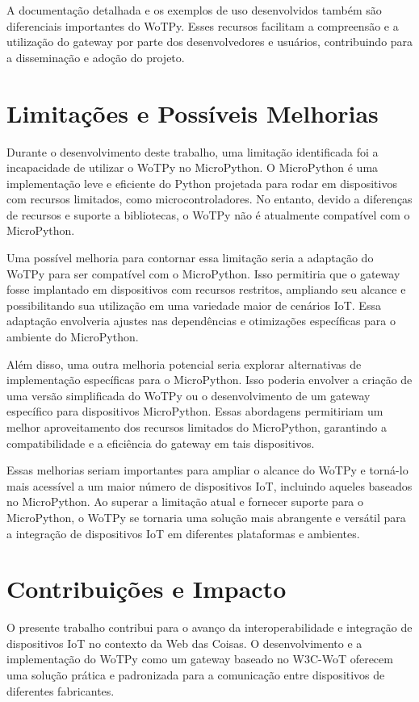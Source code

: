 A documentação detalhada e os exemplos de uso desenvolvidos também são diferenciais importantes do WoTPy. Esses recursos facilitam a compreensão e a utilização do gateway por parte dos desenvolvedores e usuários, contribuindo para a disseminação e adoção do projeto.

\section{Limitações e Possíveis Melhorias}

Durante o desenvolvimento deste trabalho, uma limitação identificada foi a incapacidade de utilizar o WoTPy no MicroPython. O MicroPython é uma implementação leve e eficiente do Python projetada para rodar em dispositivos com recursos limitados, como microcontroladores. No entanto, devido a diferenças de recursos e suporte a bibliotecas, o WoTPy não é atualmente compatível com o MicroPython.

Uma possível melhoria para contornar essa limitação seria a adaptação do WoTPy para ser compatível com o MicroPython. Isso permitiria que o gateway fosse implantado em dispositivos com recursos restritos, ampliando seu alcance e possibilitando sua utilização em uma variedade maior de cenários IoT. Essa adaptação envolveria ajustes nas dependências e otimizações específicas para o ambiente do MicroPython.

Além disso, uma outra melhoria potencial seria explorar alternativas de implementação específicas para o MicroPython. Isso poderia envolver a criação de uma versão simplificada do WoTPy ou o desenvolvimento de um gateway específico para dispositivos MicroPython. Essas abordagens permitiriam um melhor aproveitamento dos recursos limitados do MicroPython, garantindo a compatibilidade e a eficiência do gateway em tais dispositivos.

Essas melhorias seriam importantes para ampliar o alcance do WoTPy e torná-lo mais acessível a um maior número de dispositivos IoT, incluindo aqueles baseados no MicroPython. Ao superar a limitação atual e fornecer suporte para o MicroPython, o WoTPy se tornaria uma solução mais abrangente e versátil para a integração de dispositivos IoT em diferentes plataformas e ambientes.

\section{Contribuições e Impacto}

O presente trabalho contribui para o avanço da interoperabilidade e integração de dispositivos IoT no contexto da Web das Coisas. O desenvolvimento e a implementação do WoTPy como um gateway baseado no W3C-WoT oferecem uma solução prática e padronizada para a comunicação entre dispositivos de diferentes fabricantes.

